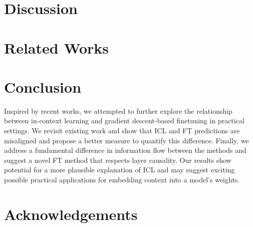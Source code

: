 \documentclass[11pt]{article}
\begin{document}
\section{Discussion}


\section{Related Works} \label{sec:related}


\section{Conclusion}
Inspired by recent works, we attempted to further explore the relationship between in-context learning and gradient descent-based finetuning in practical settings.
We revisit existing work and show that ICL and FT predictions are misaligned and propose a better measure to quantify this difference.
Finally, we address a fundamental difference in information flow between the methods and suggest a novel FT method that respects layer causality.
Our results show potential for a more plausible explanation of ICL and may suggest exciting possible practical applications for embedding context into a model's weights.  
\section{Acknowledgements}





\newpage
\appendix
% 
\end{document}
